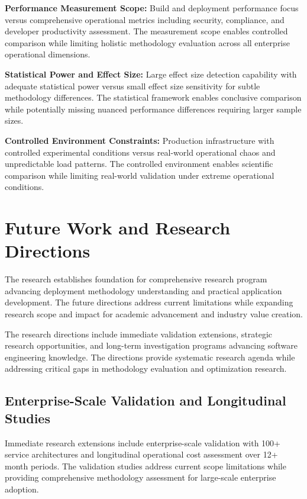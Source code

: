 \textbf{Performance Measurement Scope:}
Build and deployment performance focus versus comprehensive operational metrics including security, compliance, and developer productivity assessment. The measurement scope enables controlled comparison while limiting holistic methodology evaluation across all enterprise operational dimensions.

\textbf{Statistical Power and Effect Size:}
Large effect size detection capability with adequate statistical power versus small effect size sensitivity for subtle methodology differences. The statistical framework enables conclusive comparison while potentially missing nuanced performance differences requiring larger sample sizes.

\textbf{Controlled Environment Constraints:}
Production infrastructure with controlled experimental conditions versus real-world operational chaos and unpredictable load patterns. The controlled environment enables scientific comparison while limiting real-world validation under extreme operational conditions.

\section{Future Work and Research Directions}
\label{sec:future_work}

The research establishes foundation for comprehensive research program advancing deployment methodology understanding and practical application development. The future directions address current limitations while expanding research scope and impact for academic advancement and industry value creation.

The research directions include immediate validation extensions, strategic research opportunities, and long-term investigation programs advancing software engineering knowledge. The directions provide systematic research agenda while addressing critical gaps in methodology evaluation and optimization research.

\subsection{Enterprise-Scale Validation and Longitudinal Studies}
\label{subsec:enterprise_validation}

Immediate research extensions include enterprise-scale validation with 100+ service architectures and longitudinal operational cost assessment over 12+ month periods. The validation studies address current scope limitations while providing comprehensive methodology assessment for large-scale enterprise adoption.

